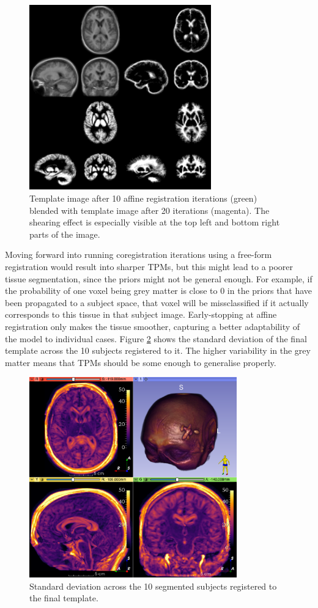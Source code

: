 \begin{figure}
  \centering
  \includegraphics[width=0.7\textwidth]{figures/affine_template_iter_9_collage}
  \centering
  \caption{Template image after 10 affine registration iterations (green) blended with template image after 20 iterations (magenta). The shearing effect is especially visible at the top left and bottom right parts of the image.}
  \label{fig:template-final}
\end{figure}


Moving forward into running coregistration iterations using a free-form registration would result into sharper TPMs, but this might lead to a poorer tissue segmentation, since the priors might not be general enough. For example, if the probability of one voxel being grey matter is close to 0 in the priors that have been propagated to a subject space, that voxel will be missclassified if it actually corresponds to this tissue in that subject image. Early-stopping at affine registration only makes the tissue smoother, capturing a better adaptability of the model to individual cases. Figure \ref{fig:template-std} shows the standard deviation of the final template across the 10 subjects registered to it. The higher variability in the grey matter means that TPMs should be some enough to generalise properly.

\begin{figure}
  \includegraphics[width=0.8\textwidth]{figures/affine_9_std}
  \centering
  \caption{Standard deviation across the 10 segmented subjects registered to the final template.}
  \label{fig:template-std}
\end{figure}
